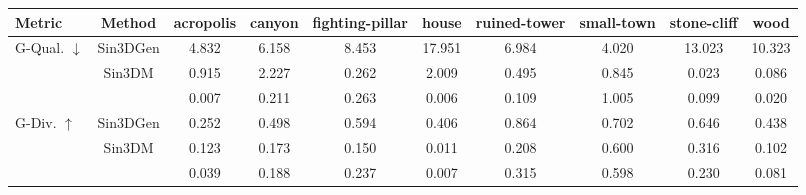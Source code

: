\begin{tabular}{ l |c|  c  c  c  c  c  c  c  c }\toprule
Metric & Method & acropolis & canyon & fighting-pillar & house & ruined-tower & small-town & stone-cliff & wood \\\midrule


\multirow{3}{*}{G-Qual. $\downarrow$} & Sin3DGen & 4.832   &    6.158   &    8.453   &    17.951   &    6.984   &    4.020   &    13.023   &    10.323 \\

 & Sin3DM & 0.915   &    2.227   &    0.262   &    2.009   &    0.495   &    0.845   &    0.023   &    0.086 \\


 & \ourmethod{} & 0.007   &    0.211   &    0.263   &    0.006   &    0.109   &    1.005   &    0.099   &    0.020 \\
\midrule

\multirow{3}{*}{G-Div. $\uparrow$} & Sin3DGen & 0.252   &    0.498   &    0.594   &    0.406   &    0.864   &    0.702   &    0.646   &    0.438 \\
 & Sin3DM  & 0.123   &    0.173   &    0.150   &    0.011   &    0.208   &    0.600   &    0.316   &    0.102 \\
 & \ourmethod{}  & 0.039   &    0.188   &    0.237   &    0.007   &    0.315   &    0.598   &    0.230   &    0.081 \\


\end{tabular}

